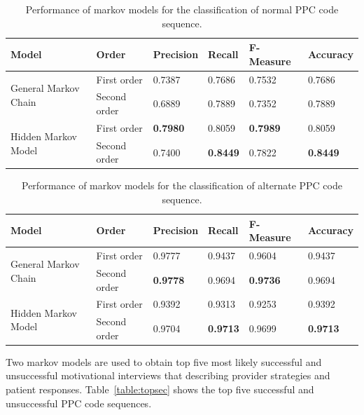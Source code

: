 \documentclass{amia}
\begin{document}
\begin{table}[h]
\centering
\caption{Performance of markov models for the classification of normal PPC code sequence.}
\label{tab:result_norm_seq}
  \begin{tabular}{|l|l|l|l|l|l|}
  \hline
   \textbf{Model} & \textbf{Order}  & \textbf{Precision}  & \textbf{Recall} & \textbf{F-Measure} & \textbf{Accuracy}\\ \hline    
    
 \multirow{2}{*}{General Markov Chain} & First order & 0.7387 & 0.7686 & 0.7532 & 0.7686\\\cline{2-6}
 & Second order & 0.6889 & 0.7889 & 0.7352 & 0.7889\\ \hline
 \multirow{2}{*}{Hidden Markov Model} & First order & \textbf{0.7980} & 0.8059 & \textbf{0.7989} & 0.8059\\ \cline{2-6}
 & Second order & 0.7400 & \textbf{0.8449} & 0.7822  & \textbf{0.8449}\\ \hline
 
  \end{tabular}
\end{table}

\begin{table}[h]
\centering
\caption{Performance of markov models for the classification of alternate PPC code sequence.}
\label{tab:result_alt_seq}
  \begin{tabular}{|l|l|l|l|l|l|}
  \hline
   \textbf{Model} & \textbf{Order}  & \textbf{Precision}  & \textbf{Recall} & \textbf{F-Measure} & \textbf{Accuracy}\\ \hline    
    
 \multirow{2}{*}{General Markov Chain} & First order & 0.9777 & 0.9437 & 0.9604 & 0.9437\\\cline{2-6}
 & Second order & \textbf{0.9778} & 0.9694 & \textbf{0.9736} & 0.9694\\ \hline
 \multirow{2}{*}{Hidden Markov Model} & First order & 0.9392 & 0.9313 & 0.9253 & 0.9392\\ \cline{2-6}
 & Second order & 0.9704 & \textbf{0.9713} & 0.9699  & \textbf{0.9713}\\ \hline
 
  \end{tabular}
\end{table}

Two markov models are used to obtain top five most likely successful and unsuccessful motivational interviews that describing provider strategies and patient responses. Table~\ref{table:topsec} shows the top five successful and unsuccessful PPC code sequences.
\end{document}
